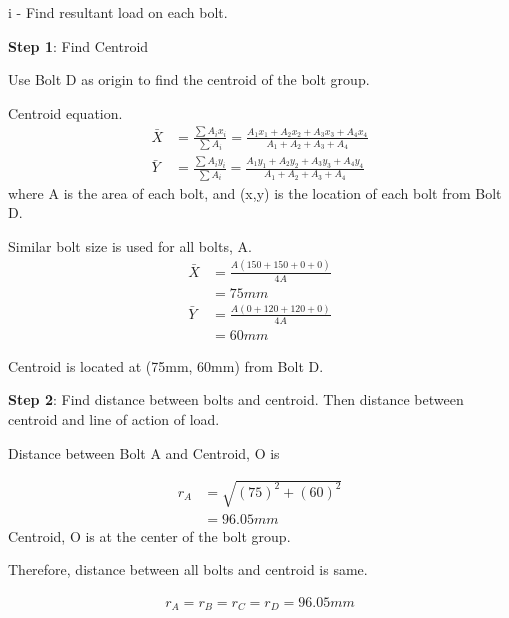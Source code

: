\documentclass[a4paper, fleqn]{article}
\begin{document}
i - Find resultant load on each bolt.\\
\vspace{10pt}

\textbf{Step 1}: Find Centroid

Use Bolt D as origin to find the centroid of the bolt group.

Centroid equation.
\begin{equation}
    \begin{aligned}
    \bar{X} &=\frac{\sum A_i x_i}{\sum A_i} = \frac{A_1 x_1 + A_2 x_2 + A_3 x_3 + A_4 x_4}{A_1 + A_2 + A_3 + A_4} \\
    \bar{Y} &= \frac{\sum A_i y_i}{\sum A_i} = \frac{A_1 y_1 + A_2 y_2 + A_3 y_3 + A_4 y_4}{A_1 + A_2 + A_3 + A_4}
    \end{aligned}
\end{equation}
where A is the area of each bolt, and (x,y) is the location of each bolt from Bolt D.

Similar bolt size is used for all bolts, A.
\begin{equation*}
    \begin{aligned}
    \bar{X} &= \frac{A(150+150+0+0)}{4A} \\
    &= 75mm \\
    \bar{Y} &= \frac{A(0+120+120+0)}{4A} \\
    &= 60mm
    \end{aligned}
\end{equation*}

Centroid is located at (75mm, 60mm) from Bolt D.

\vspace{10pt}
\textbf{Step 2}: Find distance between bolts and centroid. Then distance between centroid and line of action of load.

Distance between Bolt A and Centroid, O is

\begin{equation*}
    \begin{aligned}
        r_A&=\sqrt{(75)^2+(60)^2} \\
        &= 96.05mm
    \end{aligned}
\end{equation*}
Centroid, O is at the center of the bolt group.

Therefore, distance between all bolts and centroid is same.

\begin{equation*}
    \begin{aligned}
      r_A=r_B=r_C=r_D=96.05mm  
    \end{aligned}
\end{equation*}
\end{document}
